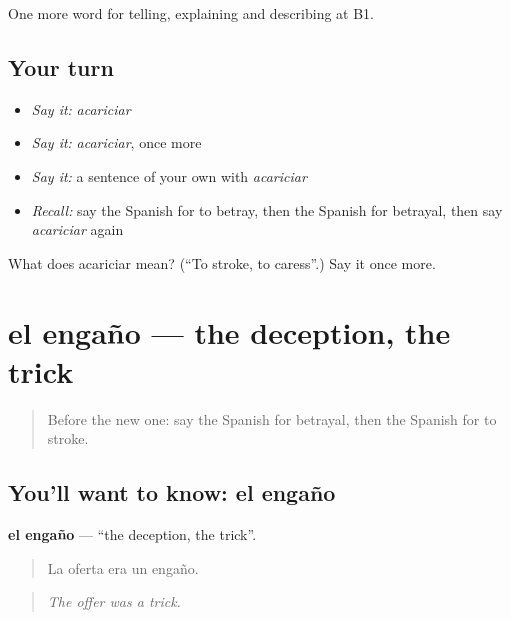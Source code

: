 \begin{grammarlens}[title={What you've built}]
One more word for telling, explaining and describing at B1.
\end{grammarlens}

\subsection*{Your turn}
\begin{itemize}
\raggedright
  \item \emph{Say it:} \emph{acariciar}
  \item \emph{Say it:} \emph{acariciar}, once more
  \item \emph{Say it:} a sentence of your own with \emph{acariciar}
  \item \emph{Recall:} say the Spanish for to betray, then the Spanish for betrayal, then say \emph{acariciar} again
\end{itemize}

\begin{tcolorbox}[breakable,colback=teal!4,colframe=teal!35!black,title={Before you move on}]
What does acariciar mean? (\textquotedblleft{}To stroke, to caress\textquotedblright{}.) Say it once more.
\end{tcolorbox}
\section[el engaño]{el engaño — the deception, the trick}

\label{lesson:ES-C746-engano}



\begin{quote}
Before the new one: say the Spanish for betrayal, then the Spanish for to stroke.
\end{quote}

\subsection*{You'll want to know: el engaño}
\textbf{el engaño} — \textquotedblleft{}the deception, the trick\textquotedblright{}.

\begin{quote}
La oferta era un engaño.
\end{quote}

\begin{quote}
\emph{The offer was a trick.}
\end{quote}

